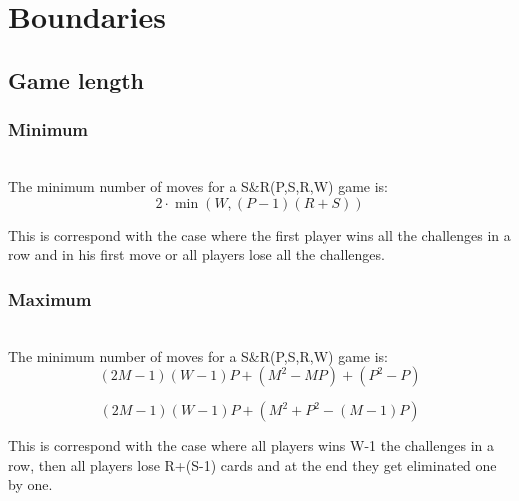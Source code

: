 \documentclass[conference]{IEEEtran}
\newcommand{\sr}{S\&{}R}
\begin{document}

\section{Boundaries}
\subsection{Game length}

\subsubsection{Minimum}
\ \\The minimum number of moves for a \sr(P,S,R,W) game is: 
\[
2 \cdot \min \left( W,(P-1)(R+S)\right)
\]

This is correspond with the case where the first player wins all the challenges in a row and in his first move or all players lose all the challenges. 
\\

\subsubsection{Maximum}
\ \\The minimum number of moves for a \sr(P,S,R,W) game is: 
\[ 
(2M-1)(W-1)P + (M^2 - MP) + (P^2 - P)
\]

\[ 
(2M-1)(W-1)P + (M^2 + P^2 - (M-1)P) 
\]

This is correspond with the case where all players wins W-1 the challenges in a row, then all players lose R+(S-1) cards and at the end they get eliminated one by one.
\\


%
%
\end{document}
